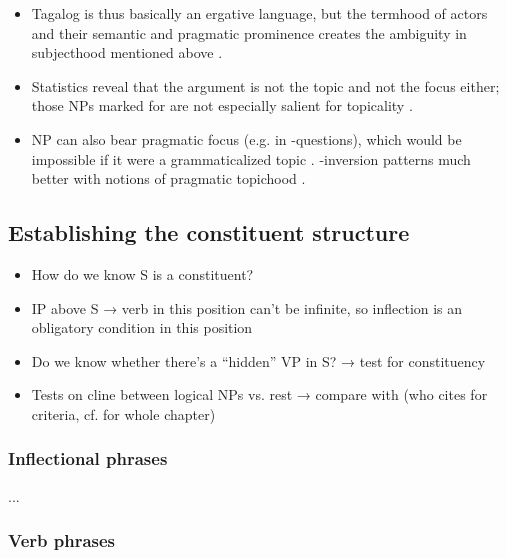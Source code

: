 \begin{itemize}
\begin{itemize}
		\item Tagalog is thus basically an ergative language, but the termhood
		of actors and their semantic and pragmatic prominence creates the
		ambiguity in subjecthood mentioned above \citep[54]{kroeger1991}.

		\item Statistics reveal that the \Nom{} argument is not the topic and
		not the focus either; those NPs marked for \Nom{} are not especially
		salient for topicality \citep[56\psqq]{kroeger1991}.

		\item \Nom{} NP can also bear pragmatic focus (e.g. in
		-questions), which would be impossible if it were a
		grammaticalized topic \citep[60\psqq]{kroeger1991}. -inversion
		patterns much better with notions of pragmatic topichood \citep[63]
		{kroeger1991}.
	\end{itemize}

\end{itemize}

\subsection{Establishing the constituent structure}

\begin{itemize}
	\item How do we know S is a constituent?
	\item IP above S → verb in this position can't be infinite, so inflection 
		is an obligatory condition in this position
	\item Do we know whether there's a ``hidden'' VP in S? → test for 
		constituency
	\item Tests on cline between logical \Subj{} NPs vs. rest → compare
		with \textcites[112]{kroeger1991} (who cites \cite[137]{speas1990}
		for criteria, cf. \citet[123--201]{speas1990} for whole chapter)
\end{itemize}

\subsubsection{Inflectional phrases}
\label{subsubsec:ips}

...

\subsubsection{Verb phrases}
\label{subsubsec:vps}

